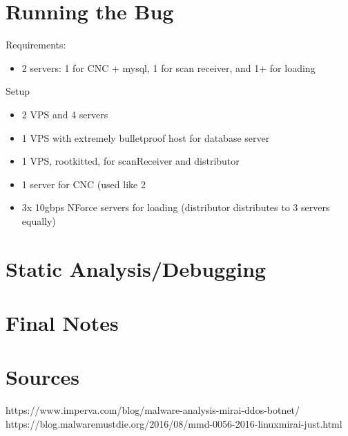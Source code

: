 \documentclass[12pt, letterpaper]{article}
\begin{document}
\begin{sloppypar}
\begin{flushleft}
\end{flushleft}


\section*{Running the Bug}
\begin{flushleft}

Requirements: \\
\begin{itemize}
\item 2 servers: 1 for CNC + mysql, 1 for scan receiver, and 1+ for loading
\end{itemize}

Setup
\begin{itemize}
\item 2 VPS and 4 servers
\item 1 VPS with extremely bulletproof host for database server
\item 1 VPS, rootkitted, for scanReceiver and distributor
\item 1 server for CNC (used like 2%
\item 3x 10gbps NForce servers for loading (distributor distributes to 3 servers equally)
\end{itemize}



\end{flushleft}



\section*{Static Analysis/Debugging}
\begin{flushleft}


\end{flushleft}


\section*{Final Notes}
\begin{flushleft}



\end{flushleft}


\section*{Sources}
\begin{flushleft}
https://www.imperva.com/blog/malware-analysis-mirai-ddos-botnet/
https://blog.malwaremustdie.org/2016/08/mmd-0056-2016-linuxmirai-just.html

\end{flushleft}



\end{sloppypar}
\end{document}
